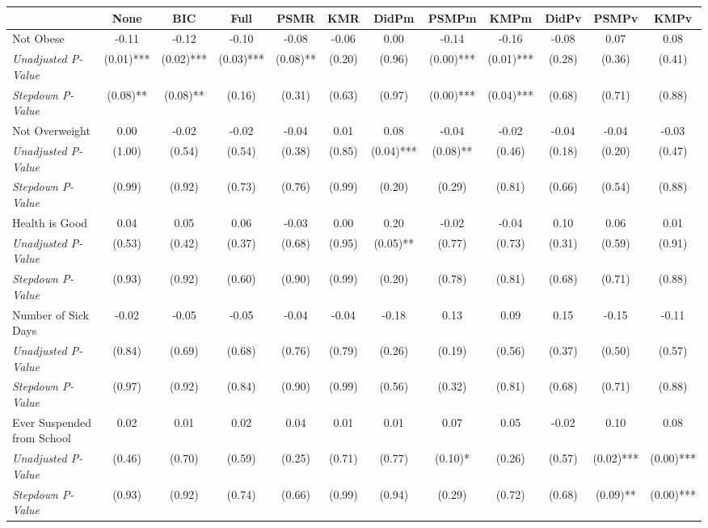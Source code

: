 \begin{tabular}{l c c c c c c c c c c c}
\toprule
 & None & BIC & Full & PSMR & KMR & DidPm & PSMPm & KMPm & DidPv & PSMPv & KMPv \\
\midrule
Not Obese & -0.11 & -0.12 & -0.10 & -0.08 & -0.06 & 0.00 & -0.14 & -0.16 & -0.08 & 0.07 & 0.08 \\
\quad \textit{Unadjusted P-Value} & (0.01)*** & (0.02)*** & (0.03)*** & (0.08)** & (0.20) & (0.96) & (0.00)*** & (0.01)*** & (0.28) & (0.36) & (0.41) \\
\quad \textit{Stepdown P-Value} & (0.08)** & (0.08)** & (0.16) & (0.31) & (0.63) & (0.97) & (0.00)*** & (0.04)*** & (0.68) & (0.71) & (0.88) \\
Not Overweight & 0.00 & -0.02 & -0.02 & -0.04 & 0.01 & 0.08 & -0.04 & -0.02 & -0.04 & -0.04 & -0.03 \\
\quad \textit{Unadjusted P-Value} & (1.00) & (0.54) & (0.54) & (0.38) & (0.85) & (0.04)*** & (0.08)** & (0.46) & (0.18) & (0.20) & (0.47) \\
\quad \textit{Stepdown P-Value} & (0.99) & (0.92) & (0.73) & (0.76) & (0.99) & (0.20) & (0.29) & (0.81) & (0.66) & (0.54) & (0.88) \\
Health is Good & 0.04 & 0.05 & 0.06 & -0.03 & 0.00 & 0.20 & -0.02 & -0.04 & 0.10 & 0.06 & 0.01 \\
\quad \textit{Unadjusted P-Value} & (0.53) & (0.42) & (0.37) & (0.68) & (0.95) & (0.05)** & (0.77) & (0.73) & (0.31) & (0.59) & (0.91) \\
\quad \textit{Stepdown P-Value} & (0.93) & (0.92) & (0.60) & (0.90) & (0.99) & (0.20) & (0.78) & (0.81) & (0.68) & (0.71) & (0.88) \\
Number of Sick Days & -0.02 & -0.05 & -0.05 & -0.04 & -0.04 & -0.18 & 0.13 & 0.09 & 0.15 & -0.15 & -0.11 \\
\quad \textit{Unadjusted P-Value} & (0.84) & (0.69) & (0.68) & (0.76) & (0.79) & (0.26) & (0.19) & (0.56) & (0.37) & (0.50) & (0.57) \\
\quad \textit{Stepdown P-Value} & (0.97) & (0.92) & (0.84) & (0.90) & (0.99) & (0.56) & (0.32) & (0.81) & (0.68) & (0.71) & (0.88) \\
Ever Suspended from School & 0.02 & 0.01 & 0.02 & 0.04 & 0.01 & 0.01 & 0.07 & 0.05 & -0.02 & 0.10 & 0.08 \\
\quad \textit{Unadjusted P-Value} & (0.46) & (0.70) & (0.59) & (0.25) & (0.71) & (0.77) & (0.10)* & (0.26) & (0.57) & (0.02)*** & (0.00)*** \\
\quad \textit{Stepdown P-Value} & (0.93) & (0.92) & (0.74) & (0.66) & (0.99) & (0.94) & (0.29) & (0.72) & (0.68) & (0.09)** & (0.00)*** \\
\bottomrule
\end{tabular}

